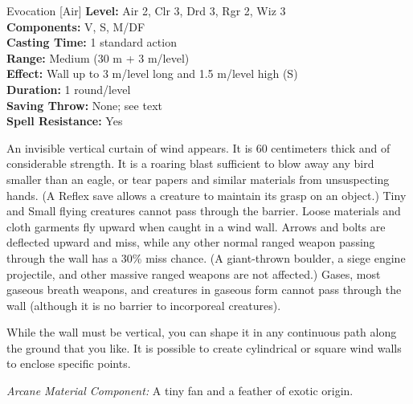 {Evocation [Air]}
{
	\textbf{Level:}
	Air 2, Clr 3, Drd 3, Rgr 2, Wiz 3\\
	\textbf{Components:}
	V, S, M/DF\\
	\textbf{Casting Time:}
	1 standard action\\
	\textbf{Range:}
	Medium (30 m + 3 m/level)\\
	\textbf{Effect:}
	Wall up to 3 m/level long and 1.5 m/level high (S)\\
	\textbf{Duration:}
	1 round/level\\
	\textbf{Saving Throw:}
	None; see text\\
	\textbf{Spell Resistance:}
	Yes\\
}
{
	An invisible vertical curtain of wind appears. It is 60 centimeters thick and of considerable strength. It is a roaring blast sufficient to blow away any bird smaller than an eagle, or tear papers and similar materials from unsuspecting hands. (A Reflex save allows a creature to maintain its grasp on an object.) Tiny and Small flying creatures cannot pass through the barrier. Loose materials and cloth garments fly upward when caught in a wind wall. Arrows and bolts are deflected upward and miss, while any other normal ranged weapon passing through the wall has a 30\% miss chance. (A giant-thrown boulder, a siege engine projectile, and other massive ranged weapons are not affected.) Gases, most gaseous breath weapons, and creatures in gaseous form cannot pass through the wall (although it is no barrier to incorporeal creatures).

	While the wall must be vertical, you can shape it in any continuous path along the ground that you like. It is possible to create cylindrical or square wind walls to enclose specific points.

	\textit{Arcane Material Component:}
	A tiny fan and a feather of exotic origin.

}

